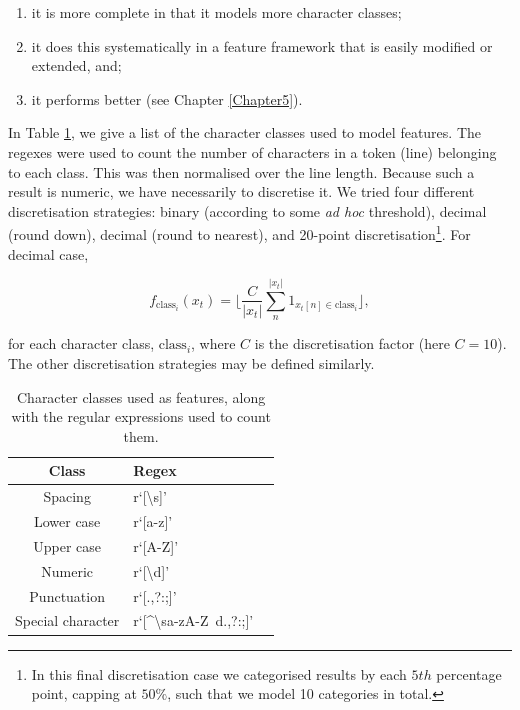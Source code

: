 \begin{enumerate}
\item it is more complete in that it models more character classes;
\item it does this systematically in a feature framework that is easily modified or extended, and;
\item it performs better (see Chapter \ref{Chapter5}).
\end{enumerate}

In Table \ref{table:characterclasses}, we give a list of the character classes used to model features. The regexes were used to count the number  of characters in a token (line) belonging to each class. This was then normalised over the line length. Because such a result is numeric, we have necessarily to discretise it. We tried four different discretisation strategies: binary (according to some \emph{ad hoc} threshold), decimal (round down), decimal (round to nearest), and 20-point discretisation\footnote{In this final discretisation case we categorised results by each $5th$ percentage point, capping at $50\%$, such that we model 10 categories in total.}. For decimal case,

\begin{equation}
f_{\text{class}_i}(x_t) = \Bigg\lfloor \frac{C}{|x_t|}\sum_n^{|x_t|} 1_{x_t[n] \in \text{class}_i} \Bigg\rfloor,
\label{eq:classfunctions}
\end{equation}

for each character class, $\text{class}_i$, where $C$ is the discretisation factor (here $C = 10$). The other discretisation strategies may be defined similarly.

\begin{table}[h]
\begin{center}
\begin{tabular}{|c|l|l|}
\hline
Class & Regex\\
\hline
Spacing & r`[\textbackslash s]'\\
Lower case & r`[a-z]'\\
Upper case & r`[A-Z]'\\
Numeric & r`[\textbackslash d]'\\
Punctuation & r`[\(\).,?:;]'\\
Special character & r`[\^{}\textbackslash sa-zA-Z\ d\(\).,?:;]'\\
\hline
\end{tabular}
\caption[Character classes used as features, along with the regular expressions used to count them.]{Character classes used as features, along with the regular expressions used to count them.}
\label{table:characterclasses}
\end{center}
\end{table}

